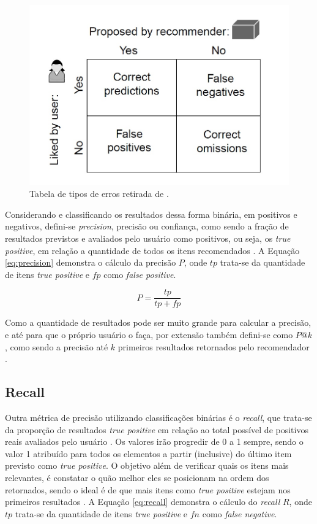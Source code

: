 \begin{figure}
	\centering
	\includegraphics[scale=0.4]{imagens/truth_table.jpg}
	\caption{Tabela de tipos de erros retirada de \cite{Jannach:2010}.}
	\label{fig:truth_table}
\end{figure}

Considerando e classificando os resultados dessa forma binária, em positivos e negativos, defini-se \textit{precision}, precisão ou confiança, como sendo a fração de resultados previstos e avaliados pelo usuário como positivos, ou seja, os \textit{true positive}, em relação a quantidade de todos os itens recomendados \citep{Powers_2008}. A Equação \ref{eq:precision} demonstra o cálculo da precisão $P$, onde $tp$ trata-se da quantidade de itens \textit{true positive} e $fp$ como \textit{false positive}.

\begin{equation}
	P = \frac{tp}{tp + fp}
\label{eq:precision}
\end{equation}

Como a quantidade de resultados pode ser muito grande para calcular a precisão, e até para que o próprio usuário o faça, por extensão também defini-se como $P@k$, como sendo a precisão até $k$ primeiros resultados retornados pelo recomendador \citep{Aggarwal2016:Evaluation}.

\subsection{Recall}

Outra métrica de precisão utilizando classificações binárias é o \textit{recall}, que trata-se da proporção de resultados \textit{true positive} em relação ao total possível de positivos reais avaliados pelo usuário \citep{Powers_2008}. Os valores irão progredir de 0 a 1 sempre, sendo o valor 1 atribuído para todos os elementos a partir (inclusive) do último item previsto como \textit{true positive}. O objetivo além de verificar quais os itens mais relevantes, é constatar o quão melhor eles se posicionam na ordem dos retornados, sendo o ideal é de que mais itens como \textit{true positive} estejam nos primeiros resultados \citep{Jannach:2010}. A Equação \ref{eq:recall} demonstra o cálculo do \textit{recall} $R$, onde $tp$ trata-se da quantidade de itens \textit{true positive} e $fn$ como \textit{false negative}.

